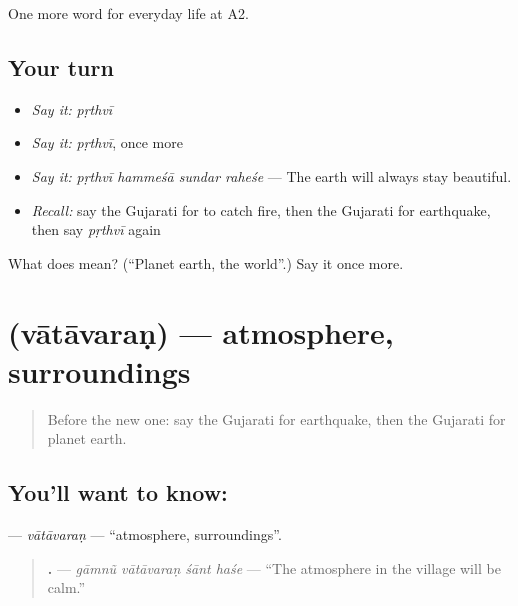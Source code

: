 \begin{grammarlens}[title={What you've built}]
One more word for everyday life at A2.
\end{grammarlens}

\subsection*{Your turn}
\begin{itemize}
\raggedright
  \item \emph{Say it:} \emph{pṛthvī}
  \item \emph{Say it:} \emph{pṛthvī}, once more
  \item \emph{Say it:} \emph{pṛthvī hammeśā sundar raheśe} — The earth will always stay beautiful.
  \item \emph{Recall:} say the Gujarati for to catch fire, then the Gujarati for earthquake, then say \emph{pṛthvī} again
\end{itemize}

\begin{tcolorbox}[breakable,colback=teal!4,colframe=teal!35!black,title={Before you move on}]
What does  mean? (\textquotedblleft{}Planet earth, the world\textquotedblright{}.) Say it once more.
\end{tcolorbox}
\section[\texorpdfstring{\gu{વાતાવરણ} (vātāvaraṇ)}{વાતાવરણ (vātāvaraṇ)}]{ (vātāvaraṇ) — atmosphere, surroundings}

\label{lesson:GU-C222-vatavaran}



\begin{quote}
Before the new one: say the Gujarati for earthquake, then the Gujarati for planet earth.
\end{quote}

\subsection*{You'll want to know: }
\textbf{} — \emph{vātāvaraṇ} — \textquotedblleft{}atmosphere, surroundings\textquotedblright{}.

\begin{quote}
\textbf{   .} — \emph{gāmnũ vātāvaraṇ śānt haśe} — \textquotedblleft{}The atmosphere in the village will be calm.\textquotedblright{}
\end{quote}

